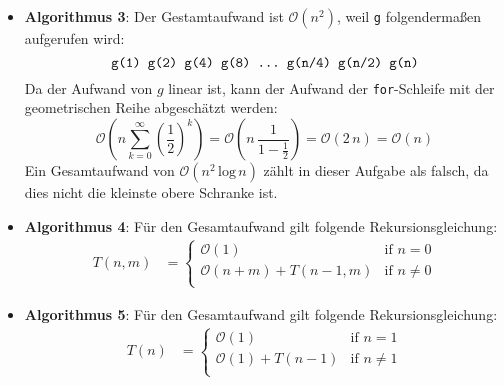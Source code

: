 \documentclass[german, solution]{acAssignment}
\begin{document}
\begin{enumerate}
\begin{acSolution}
\begin{itemize}
                \item\textbf{Algorithmus 3}:
                    Der Gestamtaufwand ist $\mathcal{O}(n^2)$, weil \texttt{g} folgendermaßen aufgerufen wird:
                    \begin{equation*}
                        \texttt{g(1) g(2) g(4) g(8) \dots\ g(n/4) g(n/2) g(n)}
                    \end{equation*}
                    Da der Aufwand von $g$ linear ist, kann der Aufwand der \texttt{for}-Schleife mit der geometrischen Reihe abgeschätzt werden:
                    \begin{equation*}
                        \mathcal{O}\left(n \sum_{k=0}^\infty \left(\frac{1}{2}\right)^k\right)
                        = \mathcal{O}\left(n\,\frac{1}{1 - \frac{1}{2}}\right)
                        = \mathcal{O}(2\,n)
                        = \mathcal{O}(n)
                    \end{equation*}
                    Ein Gesamtaufwand von $\mathcal{O}(n^2\,\mathrm{log}\,n)$ zählt in dieser Aufgabe als falsch, da dies nicht die kleinste obere Schranke ist.
                    
                \item\textbf{Algorithmus 4}:
                    Für den Gesamtaufwand gilt folgende Rekursionsgleichung:
                    \begin{align*}
                        T(n,m) &= \begin{cases}
                            \mathcal{O}(1) & \text{if $n = 0$} \\
                            \mathcal{O}(n + m) + T(n-1,m) & \text{if $n \neq 0$} \\
                        \end{cases}
                    \end{align*}
                    
                \item\textbf{Algorithmus 5}:
                    Für den Gesamtaufwand gilt folgende Rekursionsgleichung:
                    \begin{align*}
                        T(n) &= \begin{cases}
                            \mathcal{O}(1) & \text{if $n=1$} \\
                            \mathcal{O}(1) + T(n-1) & \text{if $n \neq 1$} \\
                        \end{cases}
                    \end{align*}
            \end{itemize}
        \end{acSolution}
    

\end{enumerate}
\end{document}
